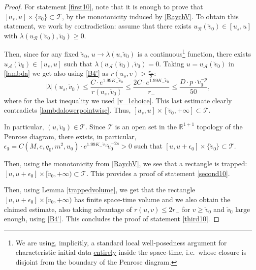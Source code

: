 \documentclass[10pt,a4paper]{article}
\theoremstyle{plain}
\theoremstyle{remark}
\theoremstyle{definition}
\newcommand{\RR}{\mathbb{R}}
\theoremstyle{plain}
\theoremstyle{remark}
\theoremstyle{definition}
\numberwithin{equation}{section}
\begin{document}
\begin{proof}
 \color{black}
For statement \ref{first10}, note that it is enough to prove that $[u_s,u] \times \{\breve{v}_0\} \subset \mathcal{T}$, by the monotonicity induced by \eqref{RaychV}. To obtain this statement, we work by contradiction: assume that there exists $u_{\mathcal{R}}(\breve{v}_0) \in [u_s,u]$ with $\lambda(u_{\mathcal{R}}(\breve{v}_0),\breve{v}_0) \geq 0$. 

 \color{black} Then, since for any fixed $\breve{v}_0$, $u \rightarrow \lambda(u,\breve{v}_0)$ is a continuous\footnote{We are using, implicitly, a standard local well-posedness argument for characteristic initial data \underline{entirely} inside the space-time, i.e.\ whose closure is disjoint from the boundary of the Penrose diagram.} function, there exists $u_{\mathcal{A}}(\breve{v}_0) \in [u_s,u]$ such that $\lambda(u_{\mathcal{A}}(\breve{v}_0),\breve{v}_0) = 0$. Taking $u=u_{\mathcal{A}}(\breve{v}_0)$ in \eqref{lambda} we get also using \eqref{B4'} as $r(u_s,v)>\frac{r_-}{2}$: $$ |\lambda|(u_s,\breve{v}_0) \leq \frac{C \cdot e^{1.99 K_- \breve{v}_0 }}{r(u_s,\breve{v}_0)} \leq  \frac{2C \cdot e^{1.99 K_- \breve{v}_0 }}{r_-} \leq  \frac{ D \cdot p \cdot \breve{v}_0^{-p} }{50} ,$$ where for the last inequality we used \eqref{v_1choice}. This last estimate clearly contradicts \eqref{lambdalowerpointwise}.	%
\color{black} Thus, $[u_s,u] \times [\breve{v}_0,+\infty] \subset \mathcal{T}$.

In particular, $(u,\breve{v}_0) \in \mathcal{T}$. Since $\mathcal{T}$ is an open set in the $\RR^{1+1}$ topology of the Penrose diagram, there exists, in particular,  $\epsilon_0=C(M,e,q_0,m^2,u_0) \cdot e^{1.99 K_- \breve{v}_0} \breve{v}_0^{-2s}>0$ such that $[u,u+\epsilon_0] \times \{\breve{v}_0\} \subset \mathcal{T}$. 


Then, using the monotonicity from \eqref{RaychV}, we see that a rectangle is trapped: $[u,u+\epsilon_0] \times [\breve{v}_0,+\infty) \subset \mathcal{T}$. This provides a proof of statement \ref{second10}.

Then, using Lemma \ref{trappedvolume}, we get that the rectangle $[u,u+\epsilon_0] \times [\breve{v}_0,+\infty)$ has finite space-time volume and we also obtain the claimed estimate, also taking advantage of $r(u,v) \leq 2r_-$ for $v \geq \breve{v}_0$ and $\breve{v}_0$ large enough, using \eqref{B4'}. This concludes the proof of statement \ref{third10}.

\end{proof}
\end{document}
